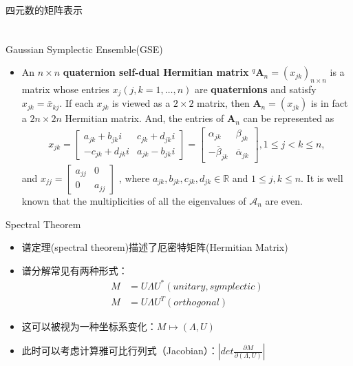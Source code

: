 \documentclass[UTF8,AutoFakeBold,AutoFakeSlant]{beamer}
\begin{document}
\begin{frame}{四元数的矩阵表示}
\begin{align*}
\begin{split}
        \end{split}
    \end{align*}
\end{frame}

\begin{frame}{Gaussian Symplectic Ensemble(GSE)}
    \begin{itemize}
        \small
        \item An $n\times n$ \textbf{quaternion self-dual Hermitian matrix} $^q\mathbf{A}_n=(x_{jk})_{n\times n}$ is a matrix whose entries $x_j(j,k=1,\ldots,n)$ are \textbf{quaternions} and satisfy $x_{jk}=\bar{x}_{kj}.$ If each $x_{jk}$ is viewed as a $2\times2$ matrix, then $\mathbf{A}_n=(x_{jk})$ is in fact a $2n\times2n$ Hermitian matrix. And, the entries of $\mathbf{A}_n$ can be represented as
              \begin{align*}
                  x_{jk}=\begin{bmatrix}a_{jk}+b_{jk}i&c_{jk}+d_{jk}i\\-c_{jk}+d_{jk}i&a_{jk}-b_{jk}i\end{bmatrix}=\begin{bmatrix}\alpha_{jk}&\beta_{jk}\\-\overline{\beta}_{jk}&\overline{\alpha}_{jk}\end{bmatrix},1\leq j<k\leq n,
              \end{align*}
              and $x_{jj}=\begin{bmatrix}a_{jj}&0\\0&a_{jj}\end{bmatrix}$ , where $a_{jk},b_{jk},c_{jk},d_{jk}\in\mathbb{R}$ and $1\leq j,k\leq n$. It is well known that the multiplicities of all the eigenvalues of $\mathcal{A}_n$ are even.
    \end{itemize}
\end{frame}

\begin{frame}{Spectral Theorem}
    \begin{itemize}
        \item 谱定理(spectral theorem)描述了厄密特矩阵(Hermitian Matrix)
        \item 谱分解常见有两种形式：
              \begin{align*}
                  M & = U \Lambda U^*  (unitary, symplectic) \\
                  M & = U \Lambda U^T  (orthogonal)
              \end{align*}
        \item 这可以被视为一种坐标系变化：$M \mapsto (\Lambda, U)$
        \item 此时可以考虑计算雅可比行列式（Jacobian）：$\left|det \frac{\partial M}{\partial\left(\Lambda, U\right)}\right|$
    \end{itemize}
\end{frame}
\end{document}
